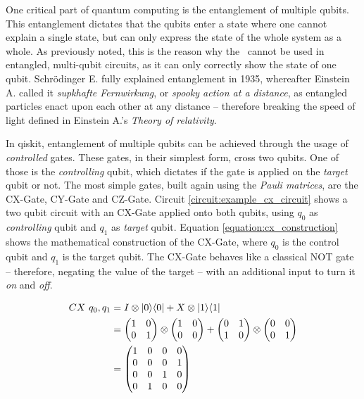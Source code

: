 One critical part of quantum computing is the entanglement of multiple qubits. This entanglement dictates that the qubits enter a state where one cannot explain a single state, but can only express the state of the whole system as a whole. As previously noted, this is the reason why the \bloch\ cannot be used in entangled, multi-qubit circuits, as it can only correctly show the state of one qubit. Schrödinger E. fully explained entanglement in 1935\cite{schroedinger_discussion_entanglement}, whereafter Einstein A. called it \emph{supkhafte Fernwirkung}, or \emph{spooky action at a distance}, as entangled particles enact upon each other at any distance – therefore breaking the speed of light defined in Einstein A.'s \emph{Theory of relativity}\cite{einstein_grundlage_1916}.  \par
In qiskit, entanglement of multiple qubits can be achieved through the usage of \emph{controlled} gates. These gates, in their simplest form, cross two qubits. One of those is the \emph{controlling} qubit, which dictates if the gate is applied on the \emph{target} qubit or not. The most simple gates, built again using the \emph{Pauli matrices}, are the CX-Gate\cite{qiskit_cxgate_nodate}, CY-Gate\cite{qiskit_cygate_nodate} and CZ-Gate\cite{qiskit_czgate_nodate}. Circuit \ref{circuit:example_cx_circuit} shows a two qubit circuit with an CX-Gate applied onto both qubits, using $q_0$ as \emph{controlling} qubit and $q_1$ as \emph{target} qubit. Equation \ref{equation:cx_construction} shows the mathematical construction of the CX-Gate, where $q_0$ is the control qubit and $q_1$ is the target qubit. The CX-Gate behaves like a classical NOT gate – therefore, negating the value of the target – with an additional input to turn it \emph{on} and \emph{off}.

\begin{equation}
    \centering
    \begin{split}
    CX\ q_0, q_1 &=
    I \otimes |0\rangle\langle0| + X \otimes |1\rangle\langle1| \\
    &= \begin{pmatrix}1 & 0\\0 & 1\end{pmatrix}\otimes\begin{pmatrix}1 & 0 \\ 0 & 0\end{pmatrix} + \begin{pmatrix}0 & 1\\1 & 0\end{pmatrix}\otimes\begin{pmatrix}0 & 0 \\ 0 & 1\end{pmatrix} \\
    &= \begin{pmatrix}
        1 & 0 & 0 & 0 \\
        0 & 0 & 0 & 1 \\
        0 & 0 & 1 & 0 \\
        0 & 1 & 0 & 0
    \end{pmatrix}
    \end{split}
    \label{equation:cx_construction}
\end{equation}

